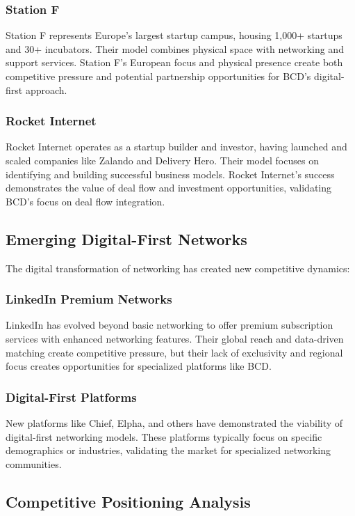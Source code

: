 \subsubsection{Station F}
Station F represents Europe's largest startup campus, housing 1,000+ startups and 30+ incubators. Their model combines physical space with networking and support services. Station F's European focus and physical presence create both competitive pressure and potential partnership opportunities for BCD's digital-first approach.

\subsubsection{Rocket Internet}
Rocket Internet operates as a startup builder and investor, having launched and scaled companies like Zalando and Delivery Hero. Their model focuses on identifying and building successful business models. Rocket Internet's success demonstrates the value of deal flow and investment opportunities, validating BCD's focus on deal flow integration.

\subsection{Emerging Digital-First Networks}

The digital transformation of networking has created new competitive dynamics:

\subsubsection{LinkedIn Premium Networks}
LinkedIn has evolved beyond basic networking to offer premium subscription services with enhanced networking features. Their global reach and data-driven matching create competitive pressure, but their lack of exclusivity and regional focus creates opportunities for specialized platforms like BCD.

\subsubsection{Digital-First Platforms}
New platforms like Chief, Elpha, and others have demonstrated the viability of digital-first networking models. These platforms typically focus on specific demographics or industries, validating the market for specialized networking communities.

\subsection{Competitive Positioning Analysis}

